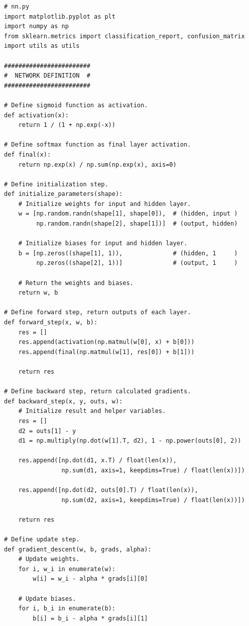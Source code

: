 \documentclass[letterpaper]{article} %
\begin{document}
\bigskip

\footnotesize{
\begin{verbatim}
# nn.py
import matplotlib.pyplot as plt
import numpy as np
from sklearn.metrics import classification_report, confusion_matrix
import utils as utils

########################
#  NETWORK DEFINITION  #
########################

# Define sigmoid function as activation.
def activation(x):
    return 1 / (1 + np.exp(-x))

# Define softmax function as final layer activation.
def final(x):
    return np.exp(x) / np.sum(np.exp(x), axis=0)

# Define initialization step.
def initialize_parameters(shape):
    # Initialize weights for input and hidden layer.
    w = [np.random.randn(shape[1], shape[0]),  # (hidden, input )
         np.random.randn(shape[2], shape[1])]  # (output, hidden)

    # Initialize biases for input and hidden layer.
    b = [np.zeros((shape[1], 1)),              # (hidden, 1     )
         np.zeros((shape[2], 1))]              # (output, 1     )

    # Return the weights and biases.
    return w, b

# Define forward step, return outputs of each layer.
def forward_step(x, w, b):
    res = []
    res.append(activation(np.matmul(w[0], x) + b[0]))
    res.append(final(np.matmul(w[1], res[0]) + b[1]))

    return res

# Define backward step, return calculated gradients.
def backward_step(x, y, outs, w):
    # Initialize result and helper variables.
    res = []
    d2 = outs[1] - y
    d1 = np.multiply(np.dot(w[1].T, d2), 1 - np.power(outs[0], 2))

    res.append([np.dot(d1, x.T) / float(len(x)),
                np.sum(d1, axis=1, keepdims=True) / float(len(x))])

    res.append([np.dot(d2, outs[0].T) / float(len(x)),
                np.sum(d2, axis=1, keepdims=True) / float(len(x))])

    return res

# Define update step.
def gradient_descent(w, b, grads, alpha):
    # Update weights.
    for i, w_i in enumerate(w):
        w[i] = w_i - alpha * grads[i][0]

    # Update biases.
    for i, b_i in enumerate(b):
        b[i] = b_i - alpha * grads[i][1]


\end{verbatim}}
\end{document}
